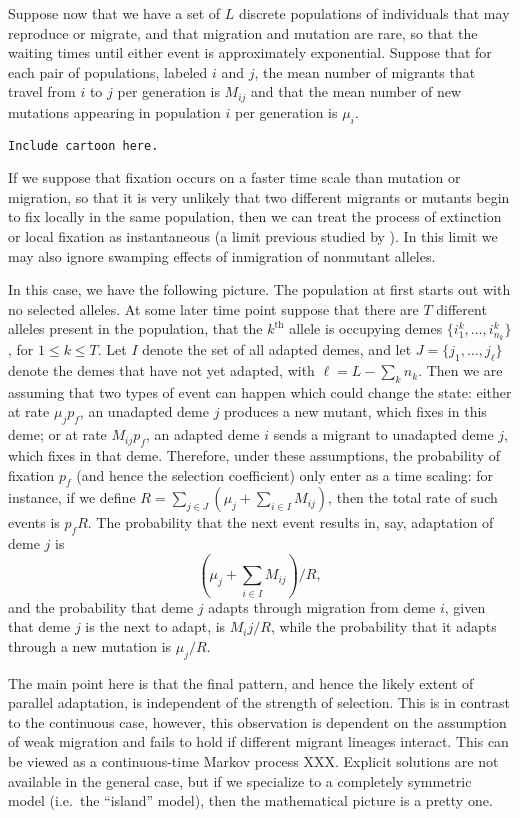 \documentclass{article}
\begin{document}
{Suppose now that we have a set of $L$ discrete populations of individuals that may reproduce or migrate,
and that migration and mutation are rare, so that the waiting times until either event is approximately exponential.
Suppose that for each pair of populations, labeled $i$ and $j$, the mean number of migrants that travel from $i$ to $j$ per generation
is $M_{ij}$ and that the mean number of new mutations appearing in population $i$ per generation is $\mu_i$.

{\tt Include cartoon here.}

If we suppose that fixation occurs on a faster time scale than mutation or migration,
so that it is very unlikely that two different migrants or mutants begin to fix locally in the same population,
then we can treat the process of extinction or local fixation as instantaneous 
(a limit previous studied by \cite{Slatkin:81}).
In this limit we may also ignore swamping effects of inmigration of nonmutant alleles.

In this case, we have the following picture.
The population at first starts out with no selected alleles. 
At some later time point suppose that there are $T$ different alleles present in the population, 
that the $k^\mathrm{th}$ allele is occupying demes $\{i^k_1, \ldots, i^k_{n_k}\}$, for $1\le k \le T$.
Let $I$ denote the set of all adapted demes, 
and let $J = \{j_1, \ldots, j_\ell\}$ denote the demes that have not yet adapted, with $\ell = L - \sum_k n_k$.
Then we are assuming that two types of event can happen which could change the state:
either at rate $\mu_j p_f$, an unadapted deme $j$ produces a new mutant, which fixes in this deme;
or at rate $M_{ij} p_f$, an adapted deme $i$ sends a migrant to unadapted deme $j$, which fixes in that deme.
Therefore, under these assumptions, the probability of fixation $p_f$ (and hence the selection coefficient)
only enter as a time scaling: for instance,
if we define $R = \sum_{j \in J} \left( \mu_j + \sum_{i \in I} M_{ij} \right)$,
then the total rate of such events is $p_f R$.
The probability that the next event results in, say, adaptation of deme $j$
is 
\[
 \left( \mu_j + \sum_{i \in I} M_{ij} \right) / R,
\]
and the probability that deme $j$ adapts through migration from deme $i$, given that deme $j$ is the next to adapt, is
$M_ij / R$,
while the probability that it adapts through a new mutation is $\mu_j / R$.

The main point here is that the final pattern,
and hence the likely extent of parallel adaptation,
is independent of the strength of selection.
This is in contrast to the continuous case, however, this observation is dependent on the assumption of weak migration
and fails to hold if different migrant lineages interact.
This can be viewed as a continuous-time Markov process XXX.
Explicit solutions are not available in the general case,
but if we specialize to a completely symmetric model (i.e.\ the ``island'' model),
then the mathematical picture is a pretty one.

}
\end{document}

